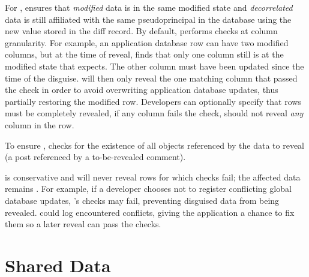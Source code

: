 %
For \two{}, \sys ensures that \emph{modified} \xxed data is in the same modified
state and \emph{decorrelated} \xxed data is still affiliated with the same
pseudoprincipal in the database using the new value stored in the diff record.
%
By default, \sys performs checks at column granularity. For example, an application
database row can have two modified columns, but at the time of reveal, \sys
finds that only one column still is at the modified state that \sys expects. The
other column must have been updated since the time of the disguise.  \sys will
then only reveal the one matching column that passed the check in order to avoid
overwriting application database updates, thus partially restoring the modified row.
Developers can optionally specify that rows must be completely revealed, \ie if
any column fails the check, \sys should not reveal \emph{any} column in the row.
%

%
To ensure \three{}, \sys checks for the existence of all objects referenced by
the data to reveal (\eg a post referenced by a to-be-revealed comment).

\sys is conservative and will never reveal rows for which checks fail; the
affected data remains \xxed.  For example, if a developer chooses not to
register conflicting global database updates, \sys's checks may
fail, preventing disguised data from being revealed.
%
\sys could log encountered conflicts, giving the application a chance to fix
them so a later reveal can pass the checks.


\section{Shared Data}
\label{s:design:shared}

